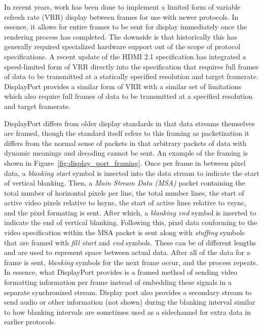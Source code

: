     In recent years, work has been done to implement a limited form of variable refresh rate (VRR) display between frames for use with newer protocols\cite{AMDFreesync,NVIDIAGsync}. In essence, it allows for entire frames to be sent for display immediately once the rendering process has completed. The downside is that historically this has generally required specialized hardware support out of the scope of protocol specifications. A recent update of the HDMI 2.1 specification\cite{HDMIForum2018} has integrated a speed-limited form of VRR directly into the specification that requires full frames of data to be transmitted at a statically specified resolution and target framerate. DisplayPort provides a similar form of VRR\cite{VESA2014} with a similar set of limitations which also require full frames of data to be transmitted at a specified resolution and target framerate.

    DisplayPort differs from older display standards in that data streams themselves are framed\cite{VESA2011,Wiley2011}, though the standard itself refers to this framing as packetization it differs from the normal sense of packets in that arbitrary packets of data with dynamic meanings and decoding cannot be sent. An example of the framing is shown in Figure~\ref{fig:display_port_framing}. Once per frame in between pixel data, a {\it blanking start} symbol is inserted into the data stream to indicate the start of vertical blanking. Then, a {\it Main Stream Data (MSA)} packet containing the total number of horizontal pixels per line, the total number lines, the start of active video pixels relative to hsync, the start of active lines relative to vsync, and the pixel formating is sent. After which, a {\it blanking end} symbol is inserted to indicate the end of vertical blanking. Following this, pixel data conforming to the video specification within the MSA packet is sent along with {\it stuffing} symbols that are framed with {\it fill start} and {\it end} symbols. These can be of different lengths and are used to represent space between actual data. After all of the data for a frame is sent, {\it blanking} symbols for the next frame occur, and the process repeats. In essence, what DisplayPort provides is a framed method of sending video formatting information per frame instead of embedding these signals in a separate synchronized stream. Display port also provides a secondary stream to send audio or other information (not shown) during the blanking interval similar to how blanking intervals are sometimes used as a sidechannel for extra data in earlier protocols.

